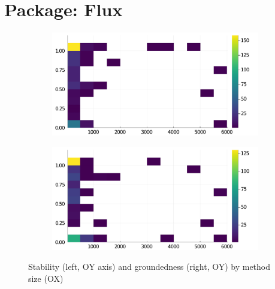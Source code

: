 \section*{Package: Flux}
\begin{figure}[h]
     \begin{subfigure}[b]{0.49\textwidth}
       \includegraphics[width=\textwidth]{figs/all-package-graphs/Flux-size-vs-stable.pdf}
     \end{subfigure}
     \begin{subfigure}[b]{0.49\textwidth}
       \includegraphics[width=\textwidth]{figs/all-package-graphs/Flux-size-vs-grounded.pdf}
     \end{subfigure}
\caption{Stability (left, OY axis) and groundedness (right, OY) by method size (OX)}%
%
\label{figs:size:Flux}
\end{figure}

